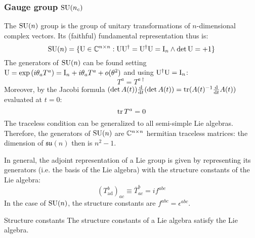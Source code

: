 \subsubsection{Gauge group \texorpdfstring{$ \mathrm{SU}(n_c) $}{SU(n)}}

The $ \mathrm{SU}(n) $ group is the group of unitary transformations of $ n $-dimensional complex vectors. Its (faithful) fundamental representation thus is:
\begin{equation*}
  \mathrm{SU}(n) = \{\mathrm{U} \in \mathbb{C}^{n \times n} : \mathrm{U}\mathrm{U}^\dagger = \mathrm{U}^\dagger\mathrm{U} = \mathrm{I}_n \land \det{\mathrm{U}} = +1 \}
\end{equation*}
The generators of $ \mathrm{SU}(n) $ can be found setting $ \mathrm{U} = \exp \left( i \theta_a T^a \right) = \mathrm{I}_n + i \theta_a T^a + o(\theta^2) $ and using $ \mathrm{U}^\dagger\mathrm{U} = \mathrm{I}_n $:
\begin{equation}
  T^a = T^{a\dagger}
  \label{eq:sun-herm}
\end{equation}
Moreover, by the Jacobi formula $ (\det A(t)) \frac{\mathrm{d}}{\mathrm{d} t} (\det A(t)) = \operatorname{tr} (A(t)^{-1} \frac{\mathrm{d}}{\mathrm{d} t} A(t)) $ evaluated at $ t = 0 $:
\begin{equation}
  \operatorname{tr} T^a = 0
  \label{eq:sun-trace}
\end{equation}
The traceless condition can be generalized to all semi-simple Lie algebras.
Therefore, the generators of $ \mathrm{SU}(n) $ are $ \mathbb{C}^{n \times n} $ hermitian traceless matrices: the dimension of $ \mathfrak{su}(n) $ then is $ n^2 - 1 $.

In general, the adjoint representation of a Lie group is given by representing its generators (i.e. the basis of the Lie algebra) with the structure constants of the Lie algebra:
\begin{equation}
  (T^b_\text{ad})_{ac} \equiv \bar{T}^b_{ac} = i f^{abc}
\end{equation}
In the case of $ \mathrm{SU}(n) $, the structure constants are $ f^{abc} = \epsilon^{abc} $.

\begin{proposition}{Structure constants}{}
  The structure constants of a Lie algebra satisfy the Lie algebra.
\end{proposition}

